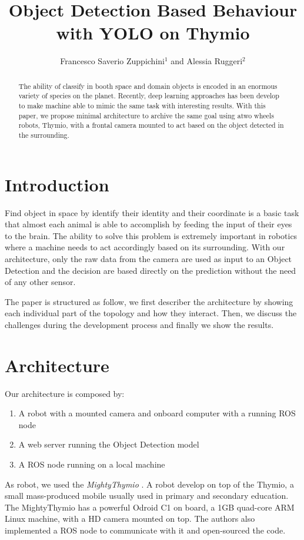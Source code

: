 \documentclass[letterpaper, 10 pt, conference]{ieeeconf}  %
\title{\LARGE \bf
Object Detection Based Behaviour with YOLO on Thymio
}
\author{Francesco Saverio Zuppichini$^{1}$ and Alessia Ruggeri$^{2}$}%
\begin{document}
\maketitle
\thispagestyle{empty}
\pagestyle{empty}


\begin{abstract}
The ability of classify in booth space and domain objects is encoded in an enormous variety of species on the planet. Recently, deep learning approaches has been develop to make machine able to mimic the same task with interesting results. With this paper, we propose minimal architecture to archive the same goal using atwo wheels robots, Thymio, with a frontal camera mounted to act based on the object detected in the surrounding. 
\end{abstract}
\section{Introduction}
Find object in space by identify their identity and their coordinate is a basic task that almost each animal is able to accomplish by feeding the input of their eyes to the brain. The ability to solve this problem is extremely important in robotics where a machine needs to act accordingly based on its surrounding. With  our architecture, only the raw data from the camera are used as input to an Object Detection and the decision are based directly on the prediction without the need of any other sensor.

The paper is structured as follow, we first describer the architecture by showing each individual part of the topology  and how they interact. Then, we discuss the challenges during the development process and finally we show the results.

\section{Architecture}
Our architecture is composed by:
\begin{enumerate}
	\item A robot with a mounted camera and onboard computer with a running ROS node
	\item A web server running the Object Detection model
	\item A ROS node running on a local machine
\end{enumerate}
As robot, we used the \emph{MightyThymio} \cite{guzzi2018eaai}. A robot develop on top of the Thymio, a small mass-produced mobile usually used in primary  and secondary education. The MightyThymio has a powerful Odroid C1 on board, a 1GB quad-core ARM Linux machine, with a HD camera mounted on top. The authors also implemented a ROS node to communicate with it and open-sourced the code.
\end{document}
